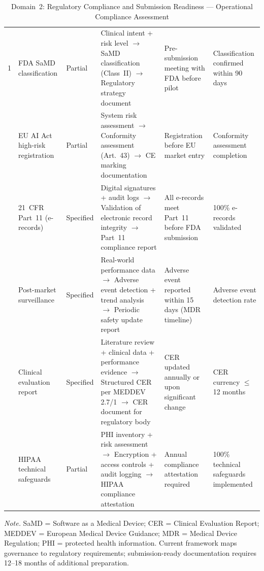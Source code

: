 \begin{table}[H]
\tablestripes
\tablefontsize
\caption[Regulatory Compliance and Submission Readiness]{Domain~2: Regulatory Compliance and Submission Readiness --- Operational Compliance Assessment}
\begin{tabularx}{\textwidth}{@{} p{0.4cm} p{2cm} p{1.4cm} L L p{1.8cm} @{}}
\toprule
\thead{\#} &  &  &  &  &  \\
 & FDA SaMD classification & Partial & Clinical intent + risk level $\to$ SaMD classification (Class~II) $\to$ Regulatory strategy document & Pre-submission meeting with FDA before pilot & Classification confirmed within 90 days \\
 & EU AI Act high-risk registration & Partial & System risk assessment $\to$ Conformity assessment (Art.~43) $\to$ CE marking documentation & Registration before EU market entry & Conformity assessment completion \\
 & 21~CFR Part~11 (e-records) & Specified & Digital signatures + audit logs $\to$ Validation of electronic record integrity $\to$ Part~11 compliance report & All e-records meet Part~11 before FDA submission & 100\% e-records validated \\
 & Post-market surveillance & Specified & Real-world performance data $\to$ Adverse event detection + trend analysis $\to$ Periodic safety update report & Adverse event reported within 15 days (MDR timeline) & Adverse event detection rate \\
 & Clinical evaluation report & Specified & Literature review + clinical data + performance evidence $\to$ Structured CER per MEDDEV 2.7/1 $\to$ CER document for regulatory body & CER updated annually or upon significant change & CER currency $\leq$12 months \\
 & HIPAA technical safeguards & Partial & PHI inventory + risk assessment $\to$ Encryption + access controls + audit logging $\to$ HIPAA compliance attestation & Annual compliance attestation required & 100\% technical safeguards implemented \\
\bottomrule
\end{tabularx}
\vspace{0.5em}\noindent\textit{Note.} SaMD = Software as a Medical Device; CER = Clinical Evaluation Report; MEDDEV = European Medical Device Guidance; MDR = Medical Device Regulation; PHI = protected health information. Current framework maps governance to regulatory requirements; submission-ready documentation requires 12--18 months of additional preparation.
\end{table}


